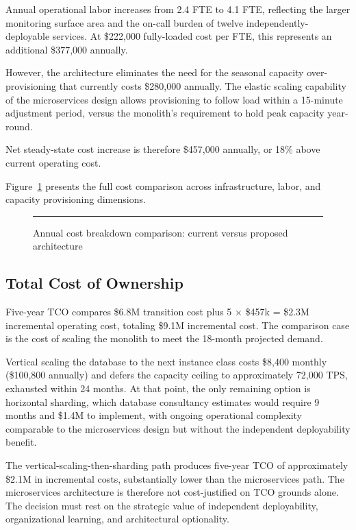 Annual operational labor increases from 2.4 FTE to 4.1 FTE, reflecting the larger monitoring surface area and the on-call burden of twelve independently-deployable services. At \$222,000 fully-loaded cost per FTE, this represents an additional \$377,000 annually.

However, the architecture eliminates the need for the seasonal capacity over-provisioning that currently costs \$280,000 annually. The elastic scaling capability of the microservices design allows provisioning to follow load within a 15-minute adjustment period, versus the monolith's requirement to hold peak capacity year-round.

Net steady-state cost increase is therefore \$457,000 annually, or 18\% above current operating cost.

Figure~\ref{fig:cost-analysis-breakdown} presents the full cost comparison across infrastructure, labor, and capacity provisioning dimensions.

\begin{figure}[htbp]
\centering
\rule{0.8\textwidth}{0.35\textwidth}
\caption{Annual cost breakdown comparison: current versus proposed architecture}
\label{fig:cost-analysis-breakdown}
\end{figure}

\subsection{Total Cost of Ownership}

Five-year TCO compares \$6.8M transition cost plus 5 × \$457k = \$2.3M incremental operating cost, totaling \$9.1M incremental cost. The comparison case is the cost of scaling the monolith to meet the 18-month projected demand.

Vertical scaling the database to the next instance class costs \$8,400 monthly (\$100,800 annually) and defers the capacity ceiling to approximately 72,000 TPS, exhausted within 24 months. At that point, the only remaining option is horizontal sharding, which database consultancy estimates would require 9 months and \$1.4M to implement, with ongoing operational complexity comparable to the microservices design but without the independent deployability benefit.

The vertical-scaling-then-sharding path produces five-year TCO of approximately \$2.1M in incremental costs, substantially lower than the microservices path. The microservices architecture is therefore not cost-justified on TCO grounds alone. The decision must rest on the strategic value of independent deployability, organizational learning, and architectural optionality.

